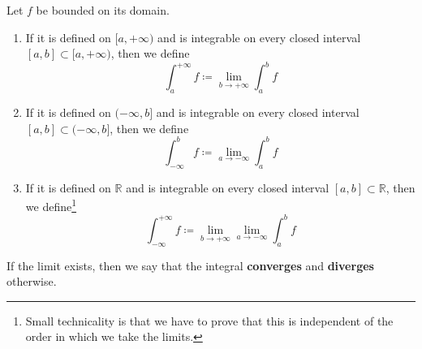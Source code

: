   \begin{definition}
    \label{def:improper-integral-of-unbounded-interval}
    Let $f$ be bounded on its domain. 
    \begin{enumerate}
      \item If it is defined on $[a, +\infty)$ and is integrable on every closed interval $[a, b] \subset [a, +\infty)$, then we define 
        \begin{equation}
          \int_a^{+\infty} f \coloneqq \lim_{b \rightarrow + \infty} \int_a^b f
        \end{equation}

      \item If it is defined on $(-\infty, b]$ and is integrable on every closed interval $[a, b] \subset (-\infty, b]$, then we define 
        \begin{equation}
          \int_{-\infty}^b f \coloneqq \lim_{a \rightarrow -\infty} \int_a^b f
        \end{equation} 

      \item If it is defined on $\mathbb{R}$ and is integrable on every closed interval $[a, b] \subset \mathbb{R}$, then we define\footnote{Small technicality is that we have to prove that this is independent of the order in which we take the limits.} 
        \begin{equation}
          \int_{-\infty}^{+\infty} f \coloneqq \lim_{b \rightarrow +\infty} \lim_{a \rightarrow -\infty} \int_a^b f
        \end{equation} 
    \end{enumerate}
    If the limit exists, then we say that the integral \textbf{converges} and \textbf{diverges} otherwise. 
  \end{definition}

